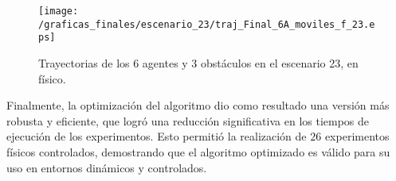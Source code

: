 \begin{figure}[H]
	\centering
	\texttt{[image: /graficas\_finales/escenario\_23/traj\_Final\_6A\_moviles\_f\_23.eps]}
	\caption{Trayectorias de los 6 agentes y 3 obstáculos en el escenario 23, en físico.}
	\label{fig3:escenario23_trajTodos}
\end{figure}

Finalmente, la optimización del algoritmo dio como resultado una versión más robusta y eficiente, que logró una reducción significativa en los tiempos de ejecución de los experimentos. Esto permitió la realización de $26$ experimentos físicos controlados, demostrando que el algoritmo optimizado es válido para su uso en entornos dinámicos y controlados.








